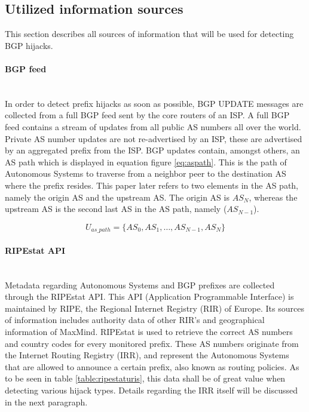\subsection{Utilized information sources}\label{subsec:utilizedinformationsources}
This section describes all sources of information that will be used for detecting BGP hijacks.

\paragraph{BGP feed}\label{par:ripestat}\mbox{ }\\
In order to detect prefix hijacks as soon as possible, BGP UPDATE messages are collected from a full BGP feed sent by the core routers of an ISP. A full BGP feed contains a stream of updates from all public AS numbers all over the world. Private AS number updates are not re-advertised by an ISP, these are advertised by an aggregated prefix from the ISP. BGP updates contain, amongst others, an AS path which is displayed in equation figure \ref{eq:aspath}. This is the path of Autonomous Systems to traverse from a neighbor peer to the destination AS where the prefix resides. This paper later refers to two elements in the AS path, namely the origin AS and the upstream AS. The origin AS is $AS_{N}$, whereas the upstream AS is the second last AS in the AS path, namely ($AS_{N-1}$).

\begin{equation}
\label{eq:aspath}
U_{as\_path} = \{ AS_{0}, AS_{1}, \ldots, AS_{N-1}, AS_{N} \}
\end{equation}


\paragraph{RIPEstat API}\label{par:ripestat}\mbox{}\\
Metadata regarding Autonomous Systems and BGP prefixes are collected through the RIPEstat API\cite{ripestats}. This API (Application Programmable Interface) is maintained by RIPE, the Regional Internet Registry (RIR) of Europe. Its sources of information includes authority data of other RIR's and geographical information of MaxMind\cite{maxmindgeoip}. RIPEstat is used to retrieve the correct AS numbers and country codes for every monitored prefix. These AS numbers originate from the Internet Routing Registry (IRR), and represent the Autonomous Systems that are allowed to announce a certain prefix, also known as routing policies\cite{battista2006extractbgp}. As to be seen in table \ref{table:ripestaturis}, this data shall be of great value when detecting various hijack types. Details regarding the IRR itself will be discussed in the next paragraph.\par

